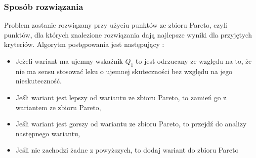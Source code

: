 \documentclass[a4paper,15pt]{article}
\begin{document}
\subsubsection{Sposób rozwiązania}
Problem zostanie rozwiązany przy użyciu punktów ze zbioru Pareto, czyli punktów, dla których znalezione rozwiązania dają najlepsze wyniki dla przyjętych kryteriów. Algorytm postępowania jest następujący :
\begin{itemize}
\item Jeżeli wariant ma ujemny wskaźnik \(Q_{1}\) to jest odrzucany ze względu na to, że nie ma sensu stosować leku o ujemnej skuteczności bez względu na jego nieskuteczność.
\item Jeśli wariant jest lepszy od wariantu ze zbioru Pareto, to 
zamień go z wariantem ze zbioru Pareto,
\item Jeśli wariant jest gorszy od wariantu ze zbioru Pareto, to
przejdź do analizy następnego wariantu,
\item Jeśli nie zachodzi żadne z powyższych, to dodaj wariant do
zbioru Pareto
\end{itemize}
\end{document}
